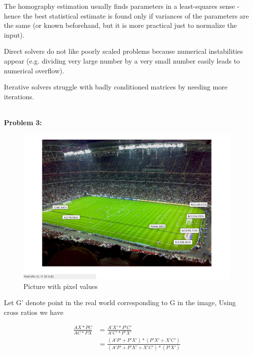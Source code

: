 \documentclass[a4paper]{article}
\begin{document}
 The homography estimation usually finds parameters in a least-squares sense - hence the best statistical estimate is found only if variances of the parameters are the same (or known beforehand, but it is more practical just to normalize the input).
 
 Direct solvers do not like poorly scaled problems because numerical instabilities appear (e.g. dividing very large number by a very small number easily leads to numerical overflow).
 
 Iterative solvers struggle with badly conditioned matrices by needing more iterations.


\hrulefill \\




\textbf{\newline Problem 3:}

\begin{figure}[ht!]
 \centering
\caption{Picture with pixel values}
\includegraphics[width=1\textwidth]{Q2/input/measured.jpg}
\end{figure}

Let G' denote point in the real world corresponding to G in the image, 
 Using cross ratios we have 

\begin{equation*} 
\begin{split}
 \frac{AX*PC}{AC*PX} &= \frac{A'X'*P'C'}{A'C'*P'X'} \\
\ &= \frac{(A'P'+P'X')*(P'X'+X'C')}{(A'P'+P'X'+X'C')*(P'X')} \\
 \end{split}
\end{equation*}
\end{document}
